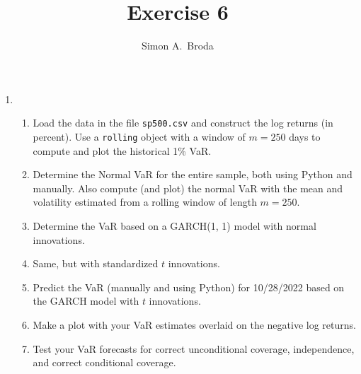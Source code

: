 \documentclass[11pt, a4paper]{article}
\begin{document}
\title{Exercise 6}
\author{Simon A.\ Broda}
\date{}
\maketitle

\begin{enumerate}

\item
\begin{enumerate}
\item Load the data in the file \texttt{sp500.csv} and construct the log returns (in percent). Use a \texttt{rolling} object with a window of $m=250$ days to compute and plot the historical 1\% VaR.
\item Determine the Normal VaR for the entire sample, both using Python and manually. Also compute (and plot) the normal VaR with the mean and volatility estimated from a rolling window of length $m=250$.
\item Determine the VaR based on a GARCH(1, 1) model with normal innovations.
\item Same, but with standardized $t$ innovations. 
\item Predict the VaR (manually and using Python) for 10/28/2022 based on the GARCH model with $t$ innovations.
\item Make a plot with your VaR estimates overlaid on the negative log returns.
\item Test your VaR forecasts for correct unconditional coverage, independence, and correct conditional coverage.
\end{enumerate}
\end{enumerate}
\end{document}
